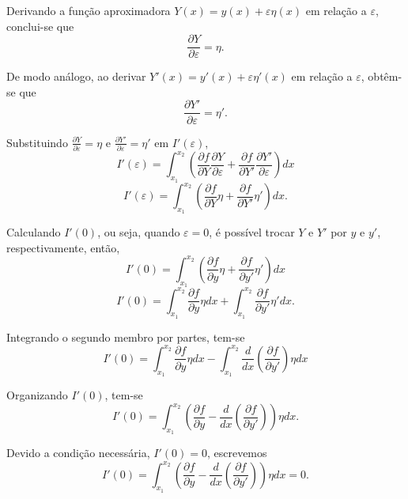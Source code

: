 \documentclass{beamer}
\begin{document}
\begin{frame}
	\justify
	
	Derivando a função aproximadora $Y(x)=y(x)+\varepsilon \eta(x)$ em relação a $\varepsilon$, conclui-se que
	$$\frac{\partial Y}{\partial \varepsilon}=\eta\text{.}$$
	\pause
	
	De modo análogo, ao derivar $Y'(x)=y'(x)+\varepsilon \eta '(x)$ em relação a $\varepsilon$, obtêm-se que
	$$\frac{\partial Y'}{\partial \varepsilon}=\eta '\text{.}$$
\end{frame}

\begin{frame}
	\justify
	
	Substituindo $\frac{\partial Y}{\partial \varepsilon}=\eta$ e $\frac{\partial Y'}{\partial \varepsilon}=\eta'$ em $I'(\varepsilon)$,
	$$
		I'(\varepsilon)=\int_{x_1}^{x_2}\left ( \frac{\partial f}{\partial Y}\frac{\partial Y}{\partial \varepsilon} + \frac{\partial f}{\partial Y'}\frac{\partial Y'}{\partial \varepsilon} \right ) dx
	$$
	\pause
	$$
		I'(\varepsilon)=\int_{x_1}^{x_2}\left ( 
			\frac{\partial f}{\partial Y} \eta +
			\frac{\partial f}{\partial Y'} \eta '
		\right )dx \text{.}
	$$
\end{frame}

\begin{frame}
	\justify
	
	Calculando $I'(0)$, ou seja, quando $\varepsilon=0$, é possível trocar $Y$ e $Y'$ por $y$ e $y'$, respectivamente, então,
	$$
		I'(0)=\int_{x_1}^{x_2}\left (
			\frac{\partial f}{\partial y} \eta +
			\frac{\partial f}{\partial y'} \eta '
		\right )dx
	$$
	\pause
	$$
		I'(0)=
			\int_{x_1}^{x_2} \frac{\partial f}{\partial y}\eta dx
			+
			\int_{x_1}^{x_2} \frac{\partial f}{\partial y'}\eta' dx \text{.}
	$$
	\pause
	
	Integrando o segundo membro por partes, tem-se
	$$
	I'(0)=
		\int_{x_1}^{x_2} \frac{\partial f}{\partial y}\eta dx
		-
		\int_{x_1}^{x_2} \frac{d}{dx} \left ( \frac{\partial f}{\partial y'} \right ) \eta dx
	$$
\end{frame}

\begin{frame}
	\justify
	
	Organizando $I'(0)$, tem-se
	$$
		I'(0)=\int_{x_1}^{x_2}\left (
			\frac{\partial f}{\partial y} -
			\frac{d}{dx}
			\left (
				\frac{\partial f}{\partial y'}
			\right )
		\right )\eta dx
		\text{.}
	$$
	\pause
	
	Devido a condição necessária, $I'(0)=0$, escrevemos
	$$
		I'(0)=\int_{x_1}^{x_2}\left (
			\frac{\partial f}{\partial y} -
			\frac{d}{dx}
			\left (
				\frac{\partial f}{\partial y'}
			\right )
		\right )\eta dx = 0
		\text{.}
	$$
\end{frame}
\end{document}
